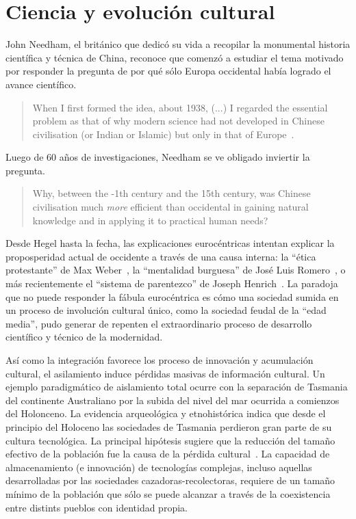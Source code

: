 \documentclass[a4paper,10pt]{book}
\theoremstyle{definition}
\begin{document}

\section{Ciencia y evoluci\'on cultural}

John Needham, el brit\'anico que dedic\'o su vida a recopilar la monumental historia cient\'ifica y t\'ecnica de China, reconoce que comenz\'o a estudiar el tema motivado por responder la pregunta de por qu\'e s\'olo Europa occidental hab\'ia logrado el avance cient\'ifico.
\begin{quotation}
When I first formed the idea, about 1938, (...) I regarded the essential problem as that of why modern science had not developed in Chinese civilisation (or Indian or Islamic) but only in that of Europe~\cite{needham2004-generalConclusionsAndReflections}.%
\end{quotation}
Luego de 60 a\~nos de investigaciones, Needham se ve obligado inviertir la pregunta.
\begin{quotation}
Why, between the -1th century and the 15th century, was Chinese civilisation much \emph{more} efficient than occidental in gaining natural knowledge and in applying it to practical human needs?~\cite{needham2004-generalConclusionsAndReflections}
\end{quotation}


Desde Hegel hasta la fecha, las explicaciones euroc\'entricas intentan explicar la proposperidad actual de occidente a trav\'es de una causa interna: la ``\'etica protestante'' de Max Weber~\cite{weber1905-eticaProtestante}, la ``mentalidad burguesa'' de Jos\'e Luis Romero~\cite{romero1967-revolucionBurguesa}, o m\'as recientemente el ``sistema de parentezco'' de Joseph Henrich~\cite{henrich2020-weirdest}.
La paradoja que no puede responder la f\'abula euroc\'entrica es c\'omo una sociedad sumida en un proceso de involuci\'on cultural único, como la sociedad feudal de la ``edad media'', pudo generar de repenten el extraordinario proceso de desarrollo cient\'ifico y t\'ecnico de la modernidad.


As\'i como la integraci\'on favorece los proceso de innovaci\'on y acumulaci\'on cultural, el asilamiento induce p\'erdidas masivas de informaci\'on cultural.
%
Un ejemplo paradigm\'atico de aislamiento total ocurre con la separaci\'on de Tasmania del continente Australiano por la subida del nivel del mar ocurrida a comienzos del Holonceno.
%
La evidencia arqueol\'ogica y etnohist\'orica indica que desde el principio del Holoceno las sociedades de Tasmania perdieron gran parte de su cultura tecnol\'ogica.
La principal hip\'otesis sugiere que la reducci\'on del tama\~no efectivo de la poblaci\'on fue la causa de la p\'erdida cultural~\cite{Henrich2004}.
%
La capacidad de almacenamiento (e innovaci\'on) de tecnolog\'ias complejas, incluso aquellas desarrolladas por las sociedades cazadoras-recolectoras, requiere de un tama\~no m\'inimo de la poblaci\'on que s\'olo se puede alcanzar a trav\'es de la coexistencia entre distints pueblos con identidad propia.
\end{document}
